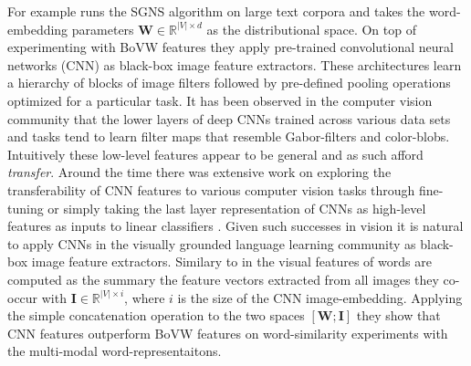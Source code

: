 For example \cite{kiela2014learning} runs the SGNS algorithm
on large text corpora and takes the word-embedding parameters
$\mathbf{W} \in \mathbb{R}^{|V| \times d}$ as the distributional space.
On top of experimenting with BoVW features they apply pre-trained convolutional
neural networks (CNN) as black-box image
feature extractors. These architectures learn a hierarchy of blocks of image filters followed by
pre-defined pooling operations optimized for a particular task.
It has been observed in the computer vision community that the lower layers of
deep CNNs trained across various data sets and tasks tend to learn filter maps
that resemble Gabor-filters and color-blobs. Intuitively these low-level features appear to be general
and as such afford \emph{transfer}. Around the time there was extensive work on exploring the transferability
of CNN features to various computer vision tasks through fine-tuning
 \cite{donahue2014decaf,oquab2014learning} or simply taking the last layer representation of CNNs
as high-level features as inputs to linear classifiers \cite{girshick2014rich,sharif2014cnn}.
Given such successes in vision it is natural to apply CNNs in the visually grounded language learning
community as black-box image feature extractors. Similary to \cite{bruni2014multimodal} in
\cite{kiela2014learning} the visual features of words are computed as the summary the feature vectors
extracted from all images they co-occur with $\mathbf{I} \in \mathbb{R}^{|V| \times i}$, where $i$ is
the size of the CNN image-embedding.
Applying the simple concatenation operation to the two spaces $[\mathbf{W};\mathbf{I}]$
they show that CNN features outperform BoVW features on word-similarity
experiments with the multi-modal word-representaitons.


